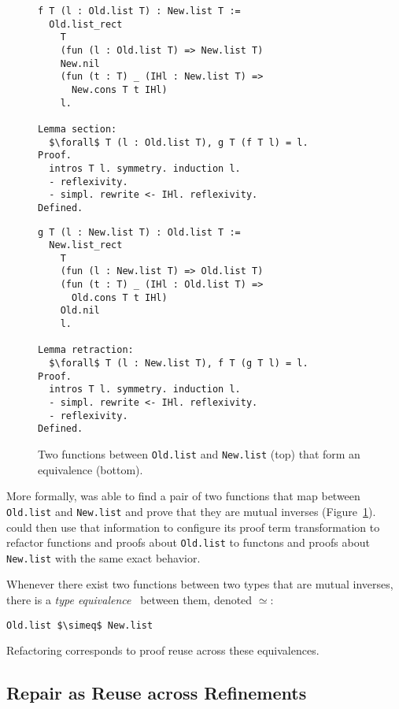 \begin{figure}
\begin{minipage}{0.48\textwidth}
\begin{lstlisting}
f T (l : Old.list T) : New.list T :=
  Old.list_rect
    T
    (fun (l : Old.list T) => New.list T)
    New.nil
    (fun (t : T) _ (IHl : New.list T) =>
      New.cons T t IHl)
    l.

Lemma section:
  $\forall$ T (l : Old.list T), g T (f T l) = l.
Proof.
  intros T l. symmetry. induction l.
  - reflexivity.
  - simpl. rewrite <- IHl. reflexivity.
Defined.
\end{lstlisting}
\end{minipage}
\hfill
\begin{minipage}{0.48\textwidth}
\begin{lstlisting}
g T (l : New.list T) : Old.list T :=
  New.list_rect
    T
    (fun (l : New.list T) => Old.list T)
    (fun (t : T) _ (IHl : Old.list T) =>
      Old.cons T t IHl)
    Old.nil
    l.

Lemma retraction:
  $\forall$ T (l : New.list T), f T (g T l) = l.
Proof.
  intros T l. symmetry. induction l.
  - simpl. rewrite <- IHl. reflexivity.
  - reflexivity.
Defined.
\end{lstlisting}
\end{minipage}
\caption{Two functions between \lstinline{Old.list} and \lstinline{New.list} (top) that form an equivalence (bottom).}
\label{fig:equivalence}
\end{figure}

More formally, \toolname was able to find a pair of two functions that map between \lstinline{Old.list}
and \lstinline{New.list} and prove that they are mutual inverses (Figure~\ref{fig:equivalence}).
\toolname could then use that information to configure its proof term transformation to refactor
functions and proofs about \lstinline{Old.list} to functons and proofs about \lstinline{New.list} with
the same exact behavior.

Whenever there exist two functions between two types that are mutual inverses,
there is a \textit{type equivalence}~\cite{univalent2013homotopy} between them, denoted $\simeq$:

\begin{lstlisting}
Old.list $\simeq$ New.list
\end{lstlisting}
Refactoring corresponds to proof reuse across these equivalences.

\subsection{Repair as Reuse across Refinements}
\label{sec:repair}

